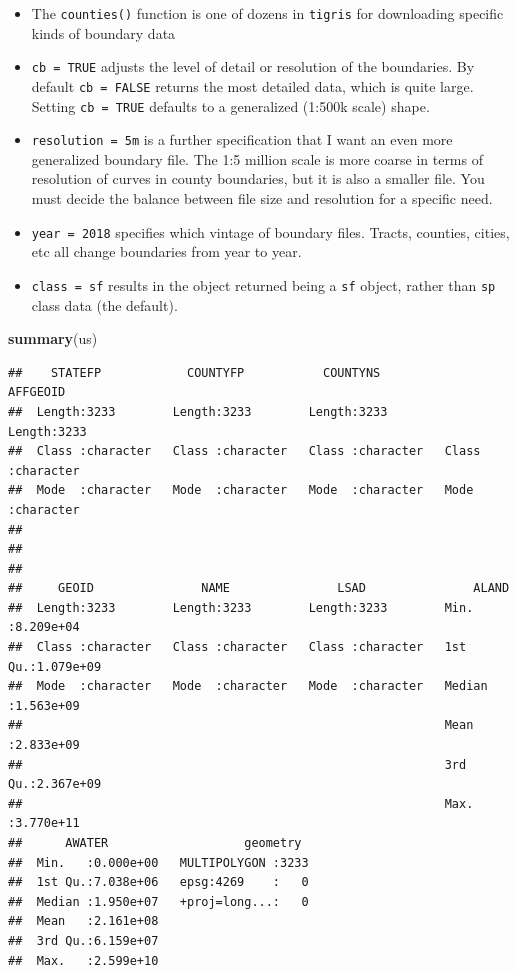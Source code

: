 \documentclass[
]{book}
\newenvironment{Shaded}{\begin{snugshade}}{\end{snugshade}}
\newcommand{\FunctionTok}[1]{\textcolor[rgb]{0.13,0.29,0.53}{\textbf{#1}}}
\newcommand{\NormalTok}[1]{#1}
\providecommand{\tightlist}{%
  \setlength{\itemsep}{0pt}\setlength{\parskip}{0pt}}
\begin{document}
\begin{itemize}
\tightlist
\item
  The \texttt{counties()} function is one of dozens in \texttt{tigris} for downloading specific kinds of boundary data
\item
  \texttt{cb\ =\ TRUE} adjusts the level of detail or resolution of the boundaries. By default \texttt{cb\ =\ FALSE} returns the most detailed data, which is quite large. Setting \texttt{cb\ =\ TRUE} defaults to a generalized (1:500k scale) shape.
\item
  \texttt{resolution\ =\ \textquotesingle{}5m\textquotesingle{}} is a further specification that I want an even more generalized boundary file. The 1:5 million scale is more coarse in terms of resolution of curves in county boundaries, but it is also a smaller file. You must decide the balance between file size and resolution for a specific need.
\item
  \texttt{year\ =\ 2018} specifies which vintage of boundary files. Tracts, counties, cities, etc all change boundaries from year to year.
\item
  \texttt{class\ =\ \textquotesingle{}sf\textquotesingle{}} results in the object returned being a \texttt{sf} object, rather than \texttt{sp} class data (the default).
\end{itemize}

\begin{Shaded}
\begin{Highlighting}[]
\FunctionTok{summary}\NormalTok{(us)}
\end{Highlighting}
\end{Shaded}

\begin{verbatim}
##    STATEFP            COUNTYFP           COUNTYNS           AFFGEOID        
##  Length:3233        Length:3233        Length:3233        Length:3233       
##  Class :character   Class :character   Class :character   Class :character  
##  Mode  :character   Mode  :character   Mode  :character   Mode  :character  
##                                                                             
##                                                                             
##                                                                             
##     GEOID               NAME               LSAD               ALAND          
##  Length:3233        Length:3233        Length:3233        Min.   :8.209e+04  
##  Class :character   Class :character   Class :character   1st Qu.:1.079e+09  
##  Mode  :character   Mode  :character   Mode  :character   Median :1.563e+09  
##                                                           Mean   :2.833e+09  
##                                                           3rd Qu.:2.367e+09  
##                                                           Max.   :3.770e+11  
##      AWATER                   geometry   
##  Min.   :0.000e+00   MULTIPOLYGON :3233  
##  1st Qu.:7.038e+06   epsg:4269    :   0  
##  Median :1.950e+07   +proj=long...:   0  
##  Mean   :2.161e+08                       
##  3rd Qu.:6.159e+07                       
##  Max.   :2.599e+10
\end{verbatim}
\end{document}
